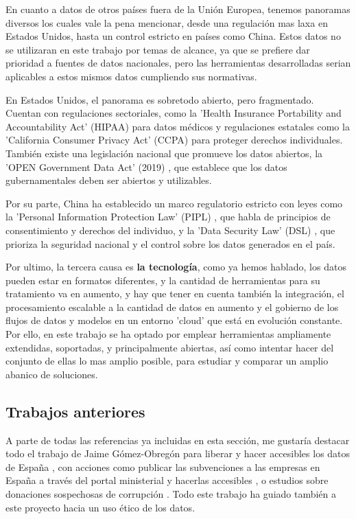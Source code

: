 En cuanto a datos de otros países fuera de la Unión Europea, tenemos panoramas diversos los cuales vale la pena mencionar, desde una regulación mas laxa en Estados Unidos, hasta un control estricto en países como China. Estos datos no se utilizaran en este trabajo por temas de alcance, ya que se prefiere dar prioridad a fuentes de datos nacionales, pero las herramientas desarrolladas serian aplicables a estos mismos datos cumpliendo sus normativas.

En Estados Unidos, el panorama es sobretodo abierto, pero fragmentado. Cuentan con regulaciones sectoriales, como la 'Health Insurance Portability and Accountability Act' (HIPAA) para datos médicos \citep{webHIPAA1996EEUU} y regulaciones estatales como la 'California Consumer Privacy Act' (CCPA) \citep{webCCPA2018California} para proteger derechos individuales. También existe una legislación nacional que promueve los datos abiertos, la 'OPEN Government Data Act' (2019) \citep{webOGDA2019EEUU}, que establece que los datos gubernamentales deben ser abiertos y utilizables.

Por su parte, China ha establecido un marco regulatorio estricto con leyes como la 'Personal Information Protection Law' (PIPL) \citep{webPIPL2021China}, que habla de principios de consentimiento y derechos del individuo, y la 'Data Security Law' (DSL) \citep{webDSL2021China}, que prioriza la seguridad nacional y el control sobre los datos generados en el país.


Por ultimo, la tercera causa es \textbf{la tecnología}, como ya hemos hablado, los datos pueden estar en formatos diferentes, y la cantidad de herramientas para su tratamiento va en aumento, y hay que tener en cuenta también la integración, el procesamiento escalable a la cantidad de datos en aumento y el gobierno de los flujos de datos y modelos en un entorno 'cloud' que está en evolución constante. Por ello, en este trabajo se ha optado por emplear herramientas ampliamente extendidas, soportadas, y principalmente abiertas, así como intentar hacer del conjunto de ellas lo mas amplio posible, para estudiar y comparar un amplio abanico de soluciones.


	\subsection{Trabajos anteriores}
	
	A parte de todas las referencias ya incluidas en esta sección, me gustaría destacar todo el trabajo de Jaime Gómez-Obregón para liberar y hacer accesibles los datos de España \citep{JaimeGomezObregon}, con acciones como publicar las subvenciones a las empresas en España a través del portal ministerial y hacerlas accesibles  \citep{JaimeGomezObregonSubvenciones}, o estudios sobre donaciones sospechosas de corrupción \citep{JaimeGomezObregonDonacion}. Todo este trabajo ha guiado también a este proyecto hacia un uso ético de los datos.
	
